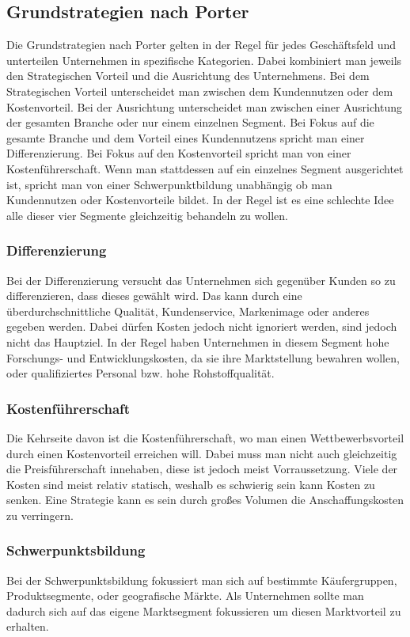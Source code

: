 \documentclass{article}
\begin{document}
  \subsection{Grundstrategien nach Porter}
  Die Grundstrategien nach Porter gelten in der Regel für jedes Geschäftsfeld und unterteilen Unternehmen in spezifische Kategorien. Dabei kombiniert man jeweils den Strategischen Vorteil und die Ausrichtung des Unternehmens. Bei dem Strategischen Vorteil unterscheidet man zwischen dem Kundennutzen oder dem Kostenvorteil. Bei der Ausrichtung unterscheidet man zwischen einer Ausrichtung der gesamten Branche oder nur einem einzelnen Segment.
  Bei Fokus auf die gesamte Branche und dem Vorteil eines Kundennutzens spricht man einer Differenzierung. Bei Fokus auf den Kostenvorteil spricht man von einer Kostenführerschaft. Wenn man stattdessen auf ein einzelnes Segment ausgerichtet ist, spricht man von einer Schwerpunktbildung unabhängig ob man Kundennutzen oder Kostenvorteile bildet. In der Regel ist es eine schlechte Idee alle dieser vier Segmente gleichzeitig behandeln zu wollen.
  \subsubsection{Differenzierung}
  Bei der Differenzierung versucht das Unternehmen sich gegenüber Kunden so zu differenzieren, dass dieses gewählt wird. Das kann durch eine überdurchschnittliche Qualität, Kundenservice, Markenimage oder anderes gegeben werden. Dabei dürfen Kosten jedoch nicht ignoriert werden, sind jedoch nicht das Hauptziel. In der Regel haben Unternehmen in diesem Segment hohe Forschungs- und Entwicklungskosten, da sie ihre Marktstellung bewahren wollen, oder qualifiziertes Personal bzw. hohe Rohstoffqualität.
  \subsubsection{Kostenführerschaft}
  Die Kehrseite davon ist die Kostenführerschaft, wo man einen Wettbewerbsvorteil durch einen Kostenvorteil erreichen will. Dabei muss man nicht auch gleichzeitig die Preisführerschaft innehaben, diese ist jedoch meist Vorraussetzung. Viele der Kosten sind meist relativ statisch, weshalb es schwierig sein kann Kosten zu senken. Eine Strategie kann es sein durch großes Volumen die Anschaffungskosten zu verringern.
  \subsubsection{Schwerpunktsbildung}
  Bei der Schwerpunktsbildung fokussiert man sich auf bestimmte Käufergruppen, Produktsegmente, oder geografische Märkte. Als Unternehmen sollte man dadurch sich auf das eigene Marktsegment fokussieren um diesen Marktvorteil zu erhalten.
\end{document}
